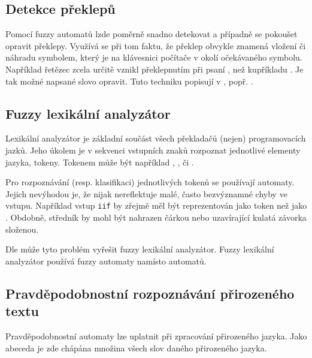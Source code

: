 \documentclass[a4paper,10pt]{article}
\begin{document}
\subsection{Detekce překlepů} \label{subs:DetTyp}
Pomocí fuzzy automatů lzde poměrně snadno detekovat a případně se pokoušet opravit překlepy. Využívá se při tom faktu, že překlep obvykle znamená vložení či náhradu symbolem, který je na klávesnici počítače v okolí očekávaného symbolu. Například řetězec  zcela určitě vznikl překlepnutím při psaní , než kupříkladu . Je tak možné napsané slovo opravit. Tuto techniku popisují v \cite{AndAbdAsm-ApprPattMatcFuzzLog}, popř. \cite{SnaKepAbrHas-AproxStriMatchFuzzAut}.


\subsection{Fuzzy lexikální analyzátor}
Lexikální analyzátor je základní součást všech překladačů (nejen) programovacích jazků. Jeho úkolem je v sekvenci vstupních znaků rozpoznat jednotlivé elementy jazyka, tokeny. Tokenem může být například , ,  či .

Pro rozpoznávání (resp. klasifikaci) jednotlivých tokenů se používají  automaty. Jejich nevýhodou je, že nijak nereflektuje malé, často bezvýznamné chyby ve vstupu. Například vstup \texttt{iif} by zřejmě měl být reprezentován jako token  než jako . Obdobně, středník by mohl být nahrazen čárkou nebo uzavírající kulatá závorka složenou.

Dle \cite{MatSalSalYu-LexAnaSimFinFuzAutMod} může tyto problém vyřešit fuzzy lexikální analyzátor. Fuzzy lexikální analyzátor používá fuzzy automaty namísto  automatů.

\subsection{Pravděpodobnostní rozpoznávání přirozeného textu}
Pravděpodobnostní automaty lze uplatnit při zpracování přirozeného jazyka. Jako abeceda je zde chápána množina všech slov daného přirozeného jazyka. 
\end{document}

